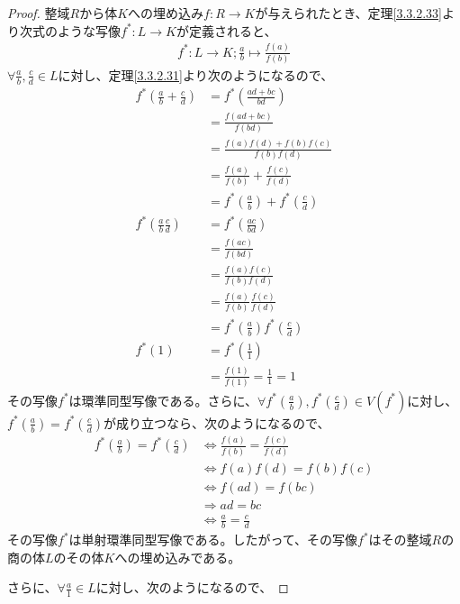 \documentclass[dvipdfmx]{jsarticle}
\begin{document}
\begin{proof}
整域$R$から体$K$への埋め込み$f:R \rightarrow K$が与えられたとき、定理\ref{3.3.2.33}より次式のような写像$f^{*}:L \rightarrow K$が定義されると、
\begin{align*}
f^{*}:L \rightarrow K;\frac{a}{b} \mapsto \frac{f(a)}{f(b)}
\end{align*}
$\forall\frac{a}{b},\frac{c}{d} \in L$に対し、定理\ref{3.3.2.31}より次のようになるので、
\begin{align*}
f^{*}\left( \frac{a}{b} + \frac{c}{d} \right) &= f^{*}\left( \frac{ad + bc}{bd} \right)\\
&= \frac{f(ad + bc)}{f(bd)}\\
&= \frac{f(a)f(d) + f(b)f(c)}{f(b)f(d)}\\
&= \frac{f(a)}{f(b)} + \frac{f(c)}{f(d)}\\
&= f^{*}\left( \frac{a}{b} \right) + f^{*}\left( \frac{c}{d} \right)\\
f^{*}\left( \frac{a}{b}\frac{c}{d} \right) &= f^{*}\left( \frac{ac}{bd} \right)\\
&= \frac{f(ac)}{f(bd)}\\
&= \frac{f(a)f(c)}{f(b)f(d)}\\
&= \frac{f(a)}{f(b)}\frac{f(c)}{f(d)}\\
&= f^{*}\left( \frac{a}{b} \right)f^{*}\left( \frac{c}{d} \right)\\
f^{*}(1) &= f^{*}\left( \frac{1}{1} \right)\\
&= \frac{f(1)}{f(1)} = \frac{1}{1} = 1
\end{align*}
その写像$f^{*}$は環準同型写像である。さらに、$\forall f^{*}\left( \frac{a}{b} \right),f^{*}\left( \frac{c}{d} \right) \in V\left( f^{*} \right)$に対し、$f^{*}\left( \frac{a}{b} \right) = f^{*}\left( \frac{c}{d} \right)$が成り立つなら、次のようになるので、
\begin{align*}
f^{*}\left( \frac{a}{b} \right) = f^{*}\left( \frac{c}{d} \right) &\Leftrightarrow \frac{f(a)}{f(b)} = \frac{f(c)}{f(d)}\\
&\Leftrightarrow f(a)f(d) = f(b)f(c)\\
&\Leftrightarrow f(ad) = f(bc)\\
&\Rightarrow ad = bc\\
&\Leftrightarrow \frac{a}{b} = \frac{c}{d}
\end{align*}
その写像$f^{*}$は単射環準同型写像である。したがって、その写像$f^{*}$はその整域$R$の商の体$L$のその体$K$への埋め込みである。\par
さらに、$\forall\frac{a}{1} \in L$に対し、次のようになるので、

\end{proof}
\end{document}
